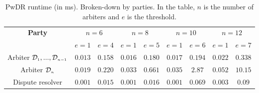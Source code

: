 

 \begin{table*}[!htbp]

\caption{ \small PwDR runtime (in ms). Broken-down by parties. In the table, $n$ is the number of arbiters and $e$ is the threshold.} \label{table::PwDR-runtime} 
\begin{center}

\begin{tabular}{|c|c|c|c|c|c|c|c|c|} 

   \hline
   

\multirow{2}{*}{\scriptsize \textbf{Party}}& \multicolumn{2}{c|}{\scriptsize $n=6$}& \multicolumn{2}{c|}{\scriptsize $n=8$}&\multicolumn{2}{c|}{\scriptsize $n=10$}&\multicolumn{2}{c|}{\scriptsize $n=12$}\\
 \cline{2-9} 
&\scriptsize$e=1$&\scriptsize$e=4$&\scriptsize$e=1$ &\scriptsize$e=5$&\scriptsize$e=1$&\scriptsize$e=6$&\scriptsize$e=1$&\scriptsize$e=7$\\

\hline

   \scriptsize   {Arbiter $\mathcal{D}_{\scriptscriptstyle 1},..., \mathcal{D}_{\scriptscriptstyle n-1}$ }&\cellcolor{gray!20}\scriptsize$0.013$&\cellcolor{gray!20}\scriptsize$0.158$& \cellcolor{gray!20}\scriptsize$0.016$& \cellcolor{gray!20}\scriptsize$ 0.180$&\cellcolor{gray!20}\scriptsize$0.017$&\cellcolor{gray!20}\scriptsize$0.194$&\cellcolor{gray!20}\scriptsize$0.022$&\cellcolor{gray!20}\scriptsize$0.338$\\
         
            \cline{1-5} 


   \scriptsize   {Arbiter $\mathcal{D}_{\scriptscriptstyle n}$ }&\cellcolor{gray!20}\scriptsize$0.019$&\cellcolor{gray!20}\scriptsize$0.220$&\cellcolor{gray!20} \cellcolor{gray!20}\scriptsize$0.033$& \cellcolor{gray!20}\scriptsize$0.661$&\cellcolor{gray!20}\scriptsize$0.035$&\cellcolor{gray!20}\scriptsize$2.87$&\cellcolor{gray!20}\scriptsize$0.052$&\cellcolor{gray!20}\scriptsize$10.15$\\      
           
            \cline{1-5} 

 \scriptsize Dispute resolver&\cellcolor{gray!20}\scriptsize$0.001$&\cellcolor{gray!20}\scriptsize$0.015$& \cellcolor{gray!20}\scriptsize $0.001$& \cellcolor{gray!20}\scriptsize$0.016$&\cellcolor{gray!20}\scriptsize$0.001$&\cellcolor{gray!20}\scriptsize$0.069$&\cellcolor{gray!20}\scriptsize$0.003$&\cellcolor{gray!20}\scriptsize$0.09$\\
 
 \hline
 
\end{tabular}  %
\end{center}

\end{table*}




